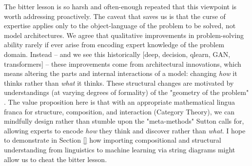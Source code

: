 
The bitter lesson is so harsh and often-enough repeated that this viewpoint is worth addressing proactively. The caveat that saves us is that the curse of expertise applies only to the object-language of the problem to be solved, not model architectures. We agree that qualitative improvements in problem-solving ability rarely if ever arise from encoding expert knowledge of the problem domain. Instead -- and we see this historically \citep{}[deep, decision, qlearn, GAN, transformers] -- these improvements come from architectural innovations, which means altering the parts and internal interactions of a model: changing \emph{how} it thinks rather than \emph{what} it thinks. These structural changes are motivated by understandings (at varying degrees of formality) of the "geometry of the problem" \citep{}. The value proposition here is that with an appropriate mathematical lingua franca for structure, composition, and interaction (Category Theory), we can mindfully design rather than stumble upon the "meta-methods" Sutton calls for, allowing experts to encode \emph{how} they think and discover rather than \emph{what}. I hope to demonstrate in Section \ref{} how importing compositional and structural understanding from linguistics to machine learning via string diagrams might allow us to cheat the bitter lesson.


